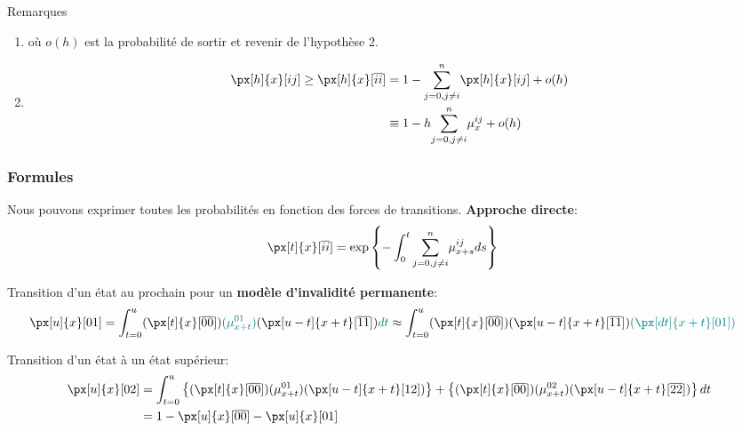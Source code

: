 \documentclass[10pt, french]{article}
\begin{document}
\begin{multicols*}{2}
\begin{conceptgen}{Remarques}
\begin{enumerate}[leftmargin = *]
	\item	{} où $o(h)$ est la probabilité de sortir et revenir de l'hypothèse 2.
	\item	
	\begin{align*}
		\px[h]{x}[ij] 
		\geq \px[h]{x}[\overline{ii}] 	
		&= 1 - \sumz{n}{j = 0, j \neq i} \px[h]{x}[ij] + o(h) 	\\
		&\equiv 1 - h \sumz{n}{j = 0, j \neq i} \mu_{x}^{ij} + o(h)
	\end{align*}
\end{enumerate}
\end{conceptgen}

\subsubsection*{Formules}
Nous pouvons exprimer toutes les probabilités en fonction des forces de transitions. 
\textbf{Approche directe}:
\begin{align*}
	\px[t]{x}[\overline{ii}]
	&=	\text{exp}\left\{	-\int_{0}^{t}\sumz{n}{j = 0, j \neq i} \mu_{x + s}^{ij} ds\right\}
\end{align*}

Transition d'un état au prochain pour un \textbf{modèle d'invalidité permanente}:
\begin{align*}
	\px[u]{x}[01] 
	&=	\int_{t = 0}^{u} (\px[t]{x}[\overline{00}]) \textcolor{teal}{(\mu_{x + t}^{01})} (\px[u - t]{x + t}[\overline{11}]) \textcolor{teal}{dt}
	\approx	\int_{t = 0}^{u} (\px[t]{x}[\overline{00}]) (\px[u - t]{x + t}[\overline{11}]) \textcolor{teal}{(\px[dt]{x + t}[01])}
\end{align*}

Transition d'un état à un état supérieur:
\begin{align*}
	\px[u]{x}[02] 
	&=	\int_{t = 0}^{u} \left\{(\px[t]{x}[\overline{00}]) (\mu_{x + t}^{01}) (\px[u - t]{x + t}[12])\right\} + \left\{(\px[t]{x}[\overline{00}]) (\mu_{x + t}^{02}) (\px[u - t]{x + t}[\overline{22}])\right\} dt	\\
	&=	1 - \px[u]{x}[\overline{00}] - \px[u]{x}[01]
\end{align*}


\end{multicols*}
\end{document}
